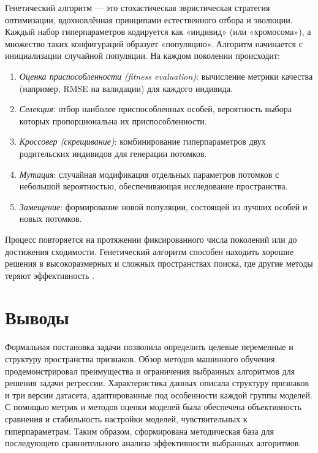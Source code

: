 Генетический алгоритм --- это стохастическая эвристическая стратегия оптимизации, вдохновлённая принципами естественного отбора и эволюции. Каждый набор гиперпараметров кодируется как «индивид» (или «хромосома»), а множество таких конфигураций образует «популяцию». Алгоритм начинается с инициализации случайной популяции. На каждом поколении происходит:

\begin{enumerate}
\item \textit{Оценка приспособленности (fitness evaluation)}:
	вычисление метрики качества (например, RMSE на валидации) для каждого индивида.
\item \textit{Селекция}:
	отбор наиболее приспособленных особей, вероятность выбора которых пропорциональна их приспособленности.
\item \textit{Кроссовер (скрещивание)}:
	комбинирование гиперпараметров двух родительских индивидов для генерации потомков.
\item \textit{Мутация}:
	 случайная модификация отдельных параметров потомков с небольшой вероятностью, обеспечивающая исследование пространства.
\item \textit{Замещение}:
	 формирование новой популяции, состоящей из лучших особей и новых потомков.
\end{enumerate}

Процесс повторяется на протяжении фиксированного числа поколений или до достижения сходимости. Генетический алгоритм способен находить хорошие решения в высокоразмерных и сложных пространствах поиска, где другие методы теряют эффективность \cite{mitchell1998ga}. 

\section{Выводы}
Формальная постановка задачи позволила определить целевые переменные и структуру пространства признаков. Обзор методов машинного обучения продемонстрировал преимущества и ограничения выбранных алгоритмов для решения задачи регрессии. Характеристика данных описала структуру признаков и три версии датасета, адаптированные под особенности каждой группы моделей. С помощью метрик и методов оценки моделей была обеспечена объективность сравнения и стабильность настройки моделей, чувствительных к гиперпараметрам. Таким образом, сформирована методическая база для последующего сравнительного анализа эффективности выбранных алгоритмов.
